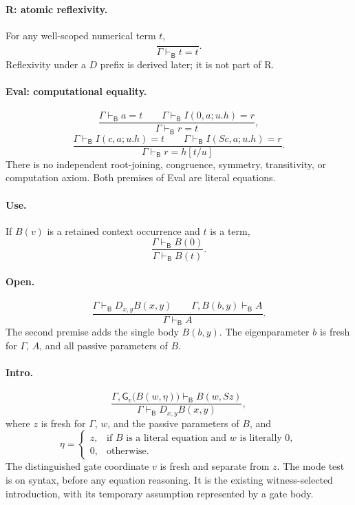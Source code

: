 \documentclass[11pt]{article}
\theoremstyle{definition}
\theoremstyle{remark}
\newcommand{\Bprf}{\mathsf{B}}
\newcommand{\gate}{\mathsf{G}}
\newcommand{\entB}{\vdash_{\Bprf}}
\begin{document}
\paragraph{R: atomic reflexivity.}
For any well-scoped numerical term $t$,
\[
                    \frac{}{\Gamma\entB t=t}.\tag{R}
\]
Reflexivity under a $D$ prefix is derived later; it is not part of R.

\paragraph{Eval: computational equality.}
\[
 \frac{\Gamma\entB a=t\qquad
       \Gamma\entB I(0,a;u.h)=r}
      {\Gamma\entB r=t},
 \tag{$E_0$}
\]
\[
 \frac{\Gamma\entB I(c,a;u.h)=t\qquad
       \Gamma\entB I(Sc,a;u.h)=r}
      {\Gamma\entB r=h[t/u]}.
 \tag{$E_S$}
\]
There is no independent root-joining, congruence, symmetry, transitivity,
or computation axiom. Both premises of Eval are literal equations.

\paragraph{Use.}
If $B(v)$ is a retained context occurrence and $t$ is a term,
\[
        \frac{\Gamma\entB B(0)}{\Gamma\entB B(t)}.
        \tag{Use}
\]

\paragraph{Open.}
\[
 \frac{\Gamma\entB D_{x,y}B(x,y)\qquad
       \Gamma,B(b,y)\entB A}
      {\Gamma\entB A}.
 \tag{Open}
\]
The second premise adds the single body $B(b,y)$. The eigenparameter $b$
is fresh for $\Gamma$, $A$, and all passive parameters of $B$.

\paragraph{Intro.}
\[
 \frac{\Gamma,\gate_v\bigl(B(w,\eta)\bigr)
                    \entB B(w,Sz)}
      {\Gamma\entB D_{x,y}B(x,y)},
 \tag{Intro}
\]
where $z$ is fresh for $\Gamma$, $w$, and the passive parameters of $B$,
and
\[
 \eta=
 \begin{cases}
 z,&\text{if $B$ is a literal equation and $w$ is literally $0$},\\
 0,&\text{otherwise}.
 \end{cases}
 \tag{Mode}
\]
The distinguished gate coordinate $v$ is fresh and separate from $z$.
The mode test is on syntax, before any equation reasoning. It is the
existing witness-selected introduction, with its temporary assumption
represented by a gate body.
\end{document}
